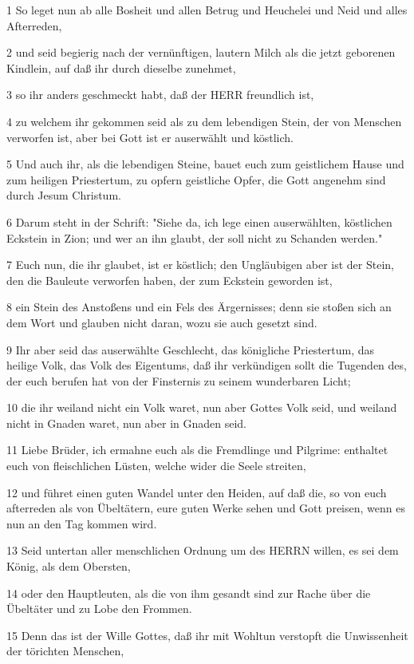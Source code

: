 \par 1 So leget nun ab alle Bosheit und allen Betrug und Heuchelei und Neid und alles Afterreden,
\par 2 und seid begierig nach der vernünftigen, lautern Milch als die jetzt geborenen Kindlein, auf daß ihr durch dieselbe zunehmet,
\par 3 so ihr anders geschmeckt habt, daß der HERR freundlich ist,
\par 4 zu welchem ihr gekommen seid als zu dem lebendigen Stein, der von Menschen verworfen ist, aber bei Gott ist er auserwählt und köstlich.
\par 5 Und auch ihr, als die lebendigen Steine, bauet euch zum geistlichem Hause und zum heiligen Priestertum, zu opfern geistliche Opfer, die Gott angenehm sind durch Jesum Christum.
\par 6 Darum steht in der Schrift: "Siehe da, ich lege einen auserwählten, köstlichen Eckstein in Zion; und wer an ihn glaubt, der soll nicht zu Schanden werden."
\par 7 Euch nun, die ihr glaubet, ist er köstlich; den Ungläubigen aber ist der Stein, den die Bauleute verworfen haben, der zum Eckstein geworden ist,
\par 8 ein Stein des Anstoßens und ein Fels des Ärgernisses; denn sie stoßen sich an dem Wort und glauben nicht daran, wozu sie auch gesetzt sind.
\par 9 Ihr aber seid das auserwählte Geschlecht, das königliche Priestertum, das heilige Volk, das Volk des Eigentums, daß ihr verkündigen sollt die Tugenden des, der euch berufen hat von der Finsternis zu seinem wunderbaren Licht;
\par 10 die ihr weiland nicht ein Volk waret, nun aber Gottes Volk seid, und weiland nicht in Gnaden waret, nun aber in Gnaden seid.
\par 11 Liebe Brüder, ich ermahne euch als die Fremdlinge und Pilgrime: enthaltet euch von fleischlichen Lüsten, welche wider die Seele streiten,
\par 12 und führet einen guten Wandel unter den Heiden, auf daß die, so von euch afterreden als von Übeltätern, eure guten Werke sehen und Gott preisen, wenn es nun an den Tag kommen wird.
\par 13 Seid untertan aller menschlichen Ordnung um des HERRN willen, es sei dem König, als dem Obersten,
\par 14 oder den Hauptleuten, als die von ihm gesandt sind zur Rache über die Übeltäter und zu Lobe den Frommen.
\par 15 Denn das ist der Wille Gottes, daß ihr mit Wohltun verstopft die Unwissenheit der törichten Menschen,
